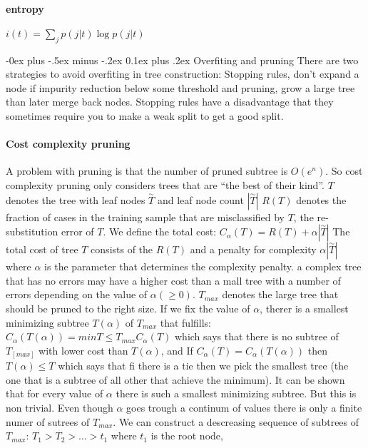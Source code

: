 \documentclass[9pt,landscape]{extarticle}
\makeatletter
\renewcommand{\subsubsection}{\@startsection{subsubsection}{3}{0mm}%
                                {-0ex plus -.5ex minus -.2ex}%
                                {0.1ex plus .2ex}%
                                {\normalfont\small\bfseries}}
\makeatother
\begin{document}
\begin{multicols}{3}
\paragraph{entropy}$i(t)=\sum_j p(j|t)\log p(j|t)$

\subsubsection{Overfiting and pruning}
There are two strategies to avoid overfiting in tree construction:
Stopping rules, don't expand a node if impurity reduction below some threshold
and pruning, grow a large tree than later merge back nodes.
Stopping rules have a disadvantage that they sometimes require you to make
a weak split to get a good split.
\paragraph{Cost complexity pruning}
A problem with pruning is that the number of pruned subtree is $O(e^n)$.
So cost complexity pruning only considers trees that are
``the best of their kind''.
$T$ denotes the tree with leaf nodes $\overset{\sim}{T}$  and leaf node count
$|\overset{\sim}{T}|$
$R(T)$ denotes the fraction of cases in the training sample that are
misclassified by $T$, the re-substitution error of $T$.
We define the total cost: $C_\alpha(T)=R(T)+\alpha |\overset{\sim}{T}|$
The total cost of tree $T$ consists of the $R(T)$ and a penalty for complexity
$\alpha|\overset{\sim}{T}|$ where $\alpha$ is the parameter that determines the
complexity penalty.
a complex tree that has no errors may have a higher cost than a mall tree with
a number of errors depending on the value of $\alpha (\geq 0)$.
$T_{max}$ denotes the large tree that should be pruned to the right size.
If we fix the value of $\alpha$, therer is a smallest minimizing subtree $T(\alpha)$
of $T_{max}$ that fulfills:
$C_\alpha(T(\alpha))=min T \leq T_{max} C_\alpha(T)$ which says that there is no
subtree of $T_[max]$ with lower cost than $T(\alpha)$, and
If $C_\alpha (T) = C_\alpha(T(\alpha))$ then $T(\alpha) \leq T$ which says that
fi there is a tie then we pick the smallest tree (the one that is a subtree of
all other that achieve the minimum).
It can be shown that for every value of $\alpha$ there is  such a smallest
minimizing subtree. But this is non trivial.
Even though $\alpha$ goes trough a continum of values there is only a finite
numer of sutrees of $T_{max}$. We can construct a descreasing sequence of
subtrees of $T_{max}$: $T_1 > T_2 > ... > {t_1} $ where $t_1$ is the root node,

\end{multicols}
\end{document}
